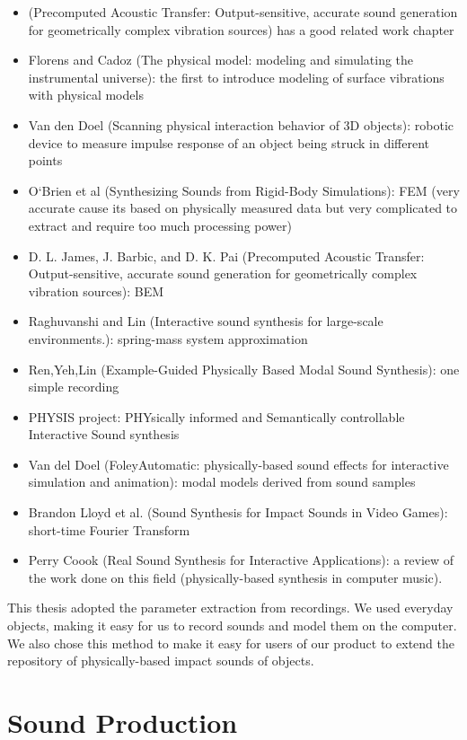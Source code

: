 \begin{itemize}
\item (Precomputed Acoustic Transfer: Output-sensitive, accurate sound generation for geometrically complex vibration sources) has a good related work chapter
\item  Florens and Cadoz (The physical model: modeling and simulating the instrumental universe): the first to introduce modeling of surface vibrations with physical models
\item Van den Doel (Scanning physical interaction behavior of 3D objects): robotic device to measure impulse response of an object being struck in different points
\item  O`Brien et al (Synthesizing Sounds from Rigid-Body Simulations): FEM (very accurate cause its based on physically measured data but very complicated to extract and require too much processing power)
\item D. L. James, J. Barbic, and D. K. Pai (Precomputed Acoustic Transfer: Output-sensitive, accurate sound generation for geometrically complex vibration sources): BEM
\item Raghuvanshi and Lin (Interactive sound synthesis for large-scale environments.): spring-mass system approximation
\item Ren,Yeh,Lin (Example-Guided Physically Based Modal Sound Synthesis): one simple recording
\item PHYSIS project: PHYsically informed and Semantically controllable
Interactive Sound synthesis
\item Van del Doel (FoleyAutomatic: physically-based sound effects for interactive simulation and animation): modal models derived from sound samples
\item Brandon Lloyd et al. (Sound Synthesis for Impact Sounds in Video Games): short-time Fourier Transform
\item Perry Coook (Real Sound Synthesis for Interactive Applications): a review of the work done on this field (physically-based synthesis in computer music).
\end{itemize}


This thesis adopted the parameter extraction from recordings. We used everyday objects, making it easy for us to record sounds and model them on the computer. We also chose this method to make it easy for users of our product to extend the repository of physically-based impact sounds of objects.

\section{Sound Production}

